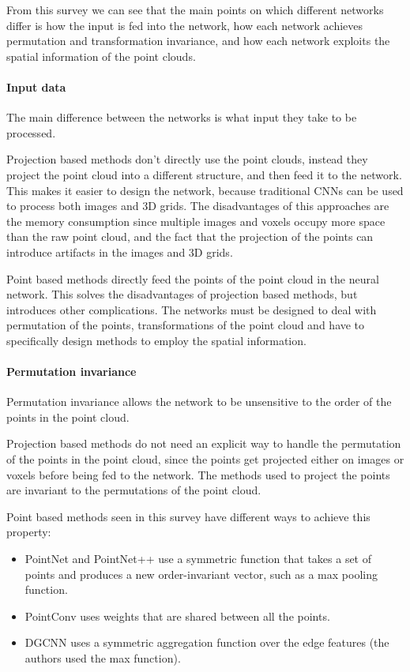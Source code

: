 From this survey we can see that the main points on which different networks differ is how the input is fed into the network, how each network achieves permutation and transformation invariance, and how each network exploits the spatial information of the point clouds.

\paragraph{Input data} The main difference between the networks is what input they take to be processed.

Projection based methods don't directly use the point clouds, instead they project the point cloud into a different structure, and then feed it to the network.
This makes it easier to design the network, because traditional CNNs can be used to process both images and 3D grids. 
The disadvantages of this approaches are the memory consumption since multiple images and voxels occupy more space than the raw point cloud, and the fact that the projection of the points can introduce artifacts in the images and 3D grids.

Point based methods directly feed the points of the point cloud in the neural network. This solves the disadvantages of projection based methods, but introduces other complications.
The networks must be designed to deal with permutation of the points, transformations of the point cloud and have to specifically design methods to employ the spatial information.

\paragraph{Permutation invariance} Permutation invariance allows the network to be unsensitive to the order of the points in the point cloud.

Projection based methods do not need an explicit way to handle the permutation of the points in the point cloud, since the points get projected either on images or voxels before being fed to the network. The methods used to project the points are invariant to the permutations of the point cloud. 

Point based methods seen in this survey have different ways to achieve this property:
\begin{itemize}
    \item PointNet and PointNet++ use a symmetric function that takes a set of points and produces a new order-invariant vector, such as a max pooling function.
    \item PointConv uses weights that are shared between all the points.
    \item DGCNN uses a symmetric aggregation function over the edge features (the authors used the max function).
\end{itemize}

